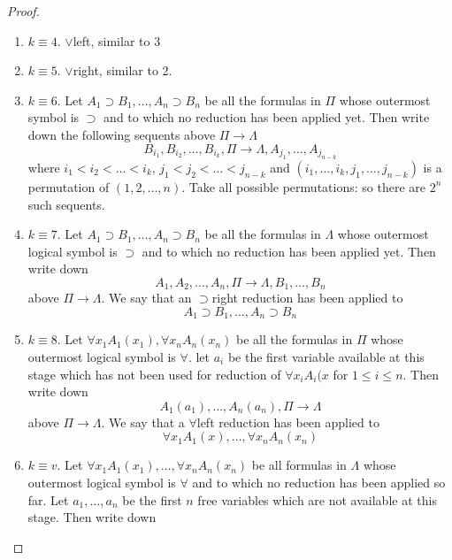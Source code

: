 \documentclass[11pt]{article}
\begin{document}
\begin{proof}
\begin{enumerate}
\item \(k\equiv 4\). \(\vee\)left, similar to 3
\item \(k\equiv5\). \(\vee\)right, similar to 2.
\item \(k\equiv6\). Let \(A_1\supset B_1,\dots,A_n\supset B_n\) be all the formulas in \(\Pi\) whose
outermost symbol is \(\supset\) and to which no reduction has been applied yet. Then write
down the following sequents above \(\Pi\to\Lambda\)
\begin{equation*}
B_{i_1},B_{i_2},\dots,B_{i_k},\Pi\to\Lambda,A_{j_1},\dots,A_{j_{n-k}}
\end{equation*}
where \(i_1<i_2<\dots<i_k\), \(j_1<j_2<\dots<j_{n-k}\) and
\((i_1,\dots,i_k,j_1,\dots,j_{n-k})\) is a permutation of \((1,2,\dots,n)\). Take all possible
permutations: so there are \(2^n\) such sequents.
\item \(k\equiv 7\). Let \(A_1\supset B_1, \dots,A_n\supset B_n\) be all the formulas in \(\Lambda\) whose outermost logical symbol
is \(\supset\) and to which no reduction has been applied yet. Then write down
\begin{equation*}
A_1,A_2,\dots,A_n,\Pi\to\Lambda,B_1,\dots,B_n
\end{equation*}
above \(\Pi\to\Lambda\). We say that an \(\supset\)right reduction has been applied to
\begin{equation*}
A_1\supset B_1,\dots,A_n\supset B_n
\end{equation*}
\item \(k\equiv 8\). Let \(\forall x_1A_1(x_1),\forall x_nA_n(x_n)\) be all the formulas in \(\Pi\) whose outermost logical
symbol is \(\forall\). let \(a_i\) be the first variable available at this stage which has not been
used for reduction of \(\forall x_iA_i(x\) for \(1\le i\le n\). Then write down
\begin{equation*}
A_1(a_1),\dots,A_n(a_n),\Pi\to\Lambda
\end{equation*}
above \(\Pi\to\Lambda\). We say that a \(\forall\)left reduction has been applied to
\begin{equation*}
\forall x_1A_1(x), \dots,\forall x_nA_n(x_n)
\end{equation*}
\item \(k\equiv v\). Let \(\forall x_1A_1(x_1),\dots,\forall x_nA_n(x_n)\) be all formulas in \(\Lambda\) whose outermost
logical symbol is \(\forall\) and to which no reduction has been applied so far. Let
\(a_1,\dots,a_n\) be the first \(n\) free variables which are not available at this stage.
Then write down
\begin{equation*}

\end{equation*}
\end{enumerate}
\end{proof}
\end{document}
